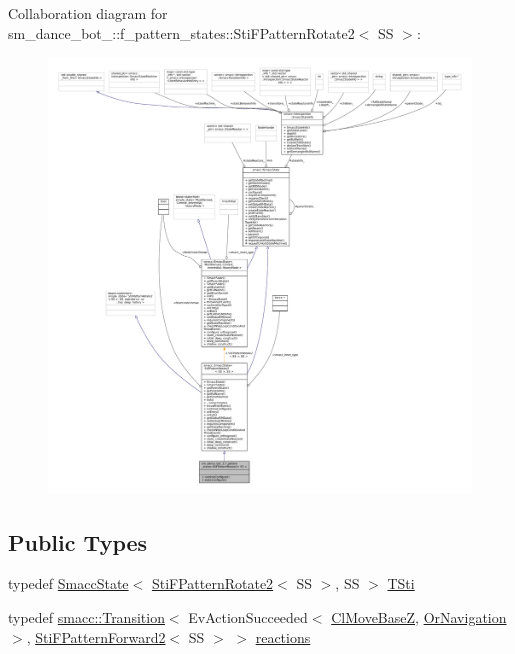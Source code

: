 Collaboration diagram for sm\+\_\+dance\+\_\+bot\+\_\+:\+:f\+\_\+pattern\+\_\+states\+:\+:Sti\+F\+Pattern\+Rotate2$<$ SS $>$\+:
\nopagebreak
\begin{figure}[H]
\begin{center}
\leavevmode
\includegraphics[width=350pt]{structsm__dance__bot__3_1_1f__pattern__states_1_1StiFPatternRotate2__coll__graph}
\end{center}
\end{figure}
\subsection*{Public Types}
\begin{DoxyCompactItemize}
\item 
typedef \hyperlink{classSmaccState}{Smacc\+State}$<$ \hyperlink{structsm__dance__bot__3_1_1f__pattern__states_1_1StiFPatternRotate2}{Sti\+F\+Pattern\+Rotate2}$<$ SS $>$, SS $>$ \hyperlink{structsm__dance__bot__3_1_1f__pattern__states_1_1StiFPatternRotate2_ac6ec0fea1b67d7ad876b9ca5884604e6}{T\+Sti}
\item 
typedef \hyperlink{classsmacc_1_1Transition}{smacc\+::\+Transition}$<$ Ev\+Action\+Succeeded$<$ \hyperlink{classmove__base__z__client_1_1ClMoveBaseZ}{Cl\+Move\+BaseZ}, \hyperlink{classsm__dance__bot__3_1_1OrNavigation}{Or\+Navigation} $>$, \hyperlink{structsm__dance__bot__3_1_1f__pattern__states_1_1StiFPatternForward2}{Sti\+F\+Pattern\+Forward2}$<$ SS $>$ $>$ \hyperlink{structsm__dance__bot__3_1_1f__pattern__states_1_1StiFPatternRotate2_a1bbaa0c9baa3589f1a35cf6b5b636088}{reactions}
\end{DoxyCompactItemize}

